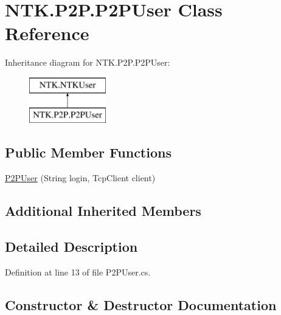 \hypertarget{class_n_t_k_1_1_p2_p_1_1_p2_p_user}{}\section{N\+T\+K.\+P2\+P.\+P2\+P\+User Class Reference}
\label{class_n_t_k_1_1_p2_p_1_1_p2_p_user}


 


Inheritance diagram for N\+T\+K.\+P2\+P.\+P2\+P\+User\+:\begin{figure}[H]
\begin{center}
\leavevmode
\includegraphics[height=2.000000cm]{d3/d95/class_n_t_k_1_1_p2_p_1_1_p2_p_user}
\end{center}
\end{figure}
\subsection*{Public Member Functions}
\begin{DoxyCompactItemize}
\item 
\mbox{\hyperlink{class_n_t_k_1_1_p2_p_1_1_p2_p_user_a341f46403f7d4ebc3e0adc48164a0560}{P2\+P\+User}} (String login, Tcp\+Client client)
\end{DoxyCompactItemize}
\subsection*{Additional Inherited Members}


\subsection{Detailed Description}




Definition at line 13 of file P2\+P\+User.\+cs.



\subsection{Constructor \& Destructor Documentation}
\mbox{\label{class_n_t_k_1_1_p2_p_1_1_p2_p_user_a341f46403f7d4ebc3e0adc48164a0560}} 
